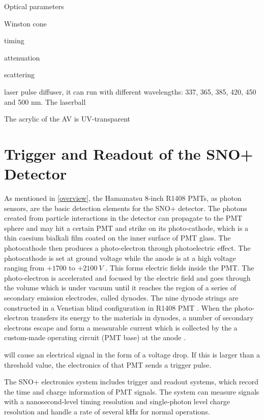 Optical parameters

Winston cone



timing


attenuation

scattering


laser pulse diffuser, it can run with different wavelengths: 337, 365, 385, 420, 450 and 500 nm.
The laserball 

The acrylic of the AV is UV-transparent

\section{Trigger and Readout of the SNO+ Detector}

As mentioned in \ref{overview}, the Hamamatsu 8-inch R1408 PMTs, as photon sensors, are the basic detection elements for the SNO+ detector. The photons created from particle interactions in the detector can propagate to the PMT sphere and may hit a certain PMT and strike on its photo-cathode, which is a thin caesium bialkali film coated on the inner surface of PMT glass. The photocathode then produces a photo-electron through photoelectric effect. The photocathode is set at ground voltage while the anode is at a high voltage ranging from $+1700$ to $+2100~V$ \cite{boger2000sudbury,dunger2018topological}. This forms electric fields inside the PMT. The photo-electron is accelerated and focused by the electric field and goes through the volume which is under vacuum until it reaches the region of a series of secondary emission electrodes, called dynodes. The nine dynode strings are constructed in a Venetian blind configuration in R1408 PMT \cite{boger2000sudbury,leo2012techniques}. When the photo-electron transfers its energy to the materials in dynodes, a number of secondary electrons escape and form a measurable current which is collected by the a custom-made operating circuit (PMT base) at the anode \cite{hamamatsu2018photomultiplier}.


 will cause an electrical signal in the form of
a voltage drop. If this is larger than a threshold value, the electronics of that
PMT sends a trigger pulse.




The SNO+ electronics system includes trigger and readout systems, which record the time and charge information of PMT signals. The system can measure signals with a nanosecond-level timing resolution and single-photon level charge resolution and handle a rate of several kHz for normal operations.


